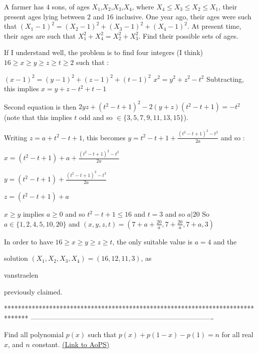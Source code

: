 \begin{solution}
	\begin{tcolorbox}A farmer has $4$ sons, of ages $X_1$,$X_2$,$X_3$,$X_4$, where $X_4\le X_3\le X_2\le X_1$, their present ages lying between $2$ and $16$ inclusive. One year ago, their ages were such that $(X_1-1)^2 = (X_2-1)^2+(X_3-1)^2+(X_4-1)^2$. At present time, their ages are such that $X_1^2+X_4^2 = X_2^2+X_3^2$. Find their possible sets of ages.\end{tcolorbox}
If I understand well, the problem is to find four integers (I think) $16\ge x\ge y\ge z\ge t\ge 2$ such that :

$(x-1)^2=(y-1)^2+(z-1)^2+(t-1)^2$
$x^2=y^2+z^2-t^2$
Subtracting, this implies $x=y+z-t^2+t-1$

Second equation is then $2yz+(t^2-t+1)^2-2(y+z)(t^2-t+1)=-t^2$ (note that this implies $t$ odd and so $\in\{3,5,7,9,11,13,15\}$).

Writing $z=a+t^2-t+1$, this becomes $y=t^2-t+1+\frac{(t^2-t+1)^2-t^2}{2a}$ and so :

$x=(t^2-t+1)+a+\frac{(t^2-t+1)^2-t^2}{2a}$

$y=(t^2-t+1)+\frac{(t^2-t+1)^2-t^2}{2a}$

$z=(t^2-t+1)+a$

$x\ge y$ implies $a\ge 0$ and so $t^2-t+1\le 16$ and $t=3$ and so $a|20$ 
So $a\in\{1,2,4,5,10,20\}$ and $(x,y,z,t)=(7+a+\frac{20}a,7+\frac{20}a,7+a,3)$

In order to have $16\ge x\ge y\ge z\ge t$, the only suitable value is $a=4$ and the  solution $\boxed{(X_1,X_2,X_3,X_4)=(16,12,11,3)}$, as \begin{bolded}vanstraelen \end{bolded}previously claimed.
\end{solution}
*******************************************************************************
-------------------------------------------------------------------------------

\begin{problem}
	Find all polynomial $p(x)$ such that $p(x)+p(1-x)-p(1)=n$ for all real $x$, and $n$ constant.
	\flushright \href{https://artofproblemsolving.com/community/c6h536726}{(Link to AoPS)}
\end{problem}



